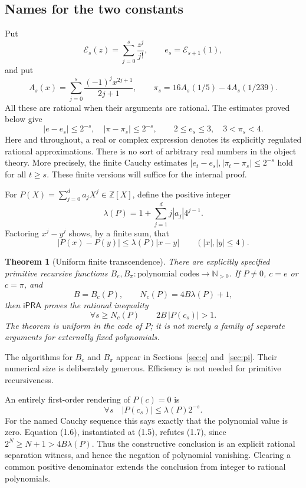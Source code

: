 \documentclass[11pt]{article}
\newtheorem{theorem}{Theorem}[section]
\theoremstyle{definition}
\newcommand{\ipra}{\mathsf{iPRA}}
\newcommand{\N}{\mathbb N}
\newcommand{\Z}{\mathbb Z}
\newcommand{\Exp}{\mathcal E}
\begin{document}
\subsection{Names for the two constants}

Put
\[
 \Exp_s(z)=\sum_{j=0}^s\frac{z^j}{j!},\qquad
 e_s=\Exp_{s+1}(1),
\]
and put
\[
 A_s(x)=\sum_{j=0}^s\frac{(-1)^j x^{2j+1}}{2j+1},
 \qquad
 \pi_s=16A_s(1/5)-4A_s(1/239).
 \tag{1.1}
\]
All these are rational when their arguments are rational. The estimates
proved below give
\[
 |e-e_s|\le 2^{-s},\quad |\pi-\pi_s|\le 2^{-s},
 \qquad 2\le e_s\le3,\quad 3<\pi_s<4.
 \tag{1.2}
\]
Here and throughout, a real or complex expression denotes its explicitly
regulated rational approximations. There is no sort of arbitrary real
numbers in the object theory. More precisely, the finite Cauchy estimates
\(|e_t-e_s|,|\pi_t-\pi_s|\le2^{-s}\) hold for all \(t\ge s\).
These finite versions will suffice for the internal proof.

For \(P(X)=\sum_{j=0}^d a_jX^j\in\Z[X]\), define the positive integer
\[
 \lambda(P)=1+\sum_{j=1}^d j|a_j|4^{j-1}.
 \tag{1.3}
\]
Factoring \(x^j-y^j\) shows, by a finite sum, that
\[
 |P(x)-P(y)|\le \lambda(P)|x-y|\qquad (|x|,|y|\le4).
 \tag{1.4}
\]

\begin{theorem}[Uniform finite transcendence]\label{thm:main}
There are explicitly specified primitive recursive functions
\(B_e,B_\pi:\text{polynomial codes}\to\N_{>0}\). If \(P\ne0\), \(c=e\)
or \(c=\pi\), and
\[
 B=B_c(P),\qquad N_c(P)=4B\lambda(P)+1,
 \tag{1.5}
\]
then \(\ipra\) proves the rational inequality
\[
 \forall s\ge N_c(P)\qquad 2B\,|P(c_s)|>1.
 \tag{1.6}
\]
The theorem is uniform in the code of \(P\); it is not merely a family of
separate arguments for externally fixed polynomials.
\end{theorem}

The algorithms for \(B_e\) and \(B_\pi\) appear in
Sections~\ref{sec:e} and~\ref{sec:pi}. Their numerical size is deliberately
generous. Efficiency is not needed for primitive recursiveness.

An entirely first-order rendering of \(P(c)=0\) is
\[
 \forall s\quad |P(c_s)|\le\lambda(P)2^{-s}.
 \tag{1.7}
\]
For the named Cauchy sequence this says exactly that the polynomial value
is zero. Equation (1.6), instantiated at (1.5), refutes (1.7), since
\(2^N\ge N+1>4B\lambda(P)\).
Thus the constructive conclusion is an explicit rational separation
witness, and hence the negation of polynomial vanishing. Clearing a common
positive denominator extends the conclusion from integer to rational
polynomials.
\end{document}
